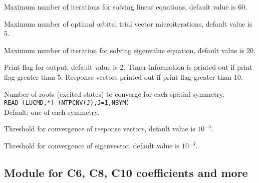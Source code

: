 \begin{description}
\item{}
Maximum number of iterations for solving linear equations, default value is 60.

\item{}
Maximum number of optimal orbital trial vector microiterations,
default value is 5.

\item{}
Maximum number of iteration for solving eigenvalue equation, default
value is 20.

\item{}
Print flag for output, default value is 2. Timer information is printed
out if print flag greater than 5. Response vectors printed out if
print flag greater than 10.

\item{}
Number of roots (excited states) to converge for each spatial symmetry. \\
\verb|READ (LUCMD,*) (NTPCNV(J),J=1,NSYM)|\\
Default: one of each symmetry.

\item{}
Threshold for convergence of response vectors, default value is $10^{-3}$.

\item{}
Threshold for convergence of eigenvector, default value is $10^{-3}$.

\end{description}

\subsection{Module for C6, C8, C10 coefficients and more}


